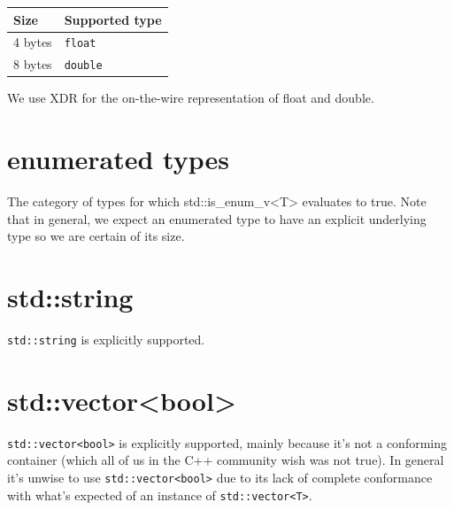\begin{tabular}{ll}
  \textbf{Size} & \textbf{Supported type} \\ \hline
  4 bytes & \texttt{float} \\
  8 bytes & \texttt{double} \\
\end{tabular}

We use XDR for the on-the-wire representation of {\ttfamily float} and
{\ttfamily double}.

\section{enumerated types}

The category of types for which {\ttfamily std::is\_enum\_v<T>} evaluates
to {\ttfamily true}.  Note that in general, we expect an enumerated type
to have an explicit underlying type so we are certain of its size.
        
\section{\ttfamily std::string}

\texttt{std::string} is explicitly supported.

\section{\ttfamily std::vector<bool>}

\texttt{std::vector<bool>} is explicitly supported, mainly because it's
not a conforming container (which all of us in the C++ community wish
was not true).  In general it's unwise to use \texttt{std::vector<bool>}
due to its lack of complete conformance with what's expected of an
instance of \texttt{std::vector<T>}.
